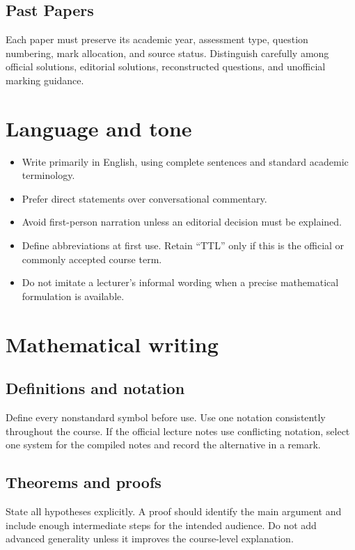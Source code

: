 \subsection{Past Papers}
Each paper must preserve its academic year, assessment type, question numbering, mark
allocation, and source status. Distinguish carefully among official solutions,
editorial solutions, reconstructed questions, and unofficial marking guidance.

\section{Language and tone}

\begin{itemize}
  \item Write primarily in English, using complete sentences and standard academic
        terminology.
  \item Prefer direct statements over conversational commentary.
  \item Avoid first-person narration unless an editorial decision must be explained.
  \item Define abbreviations at first use. Retain ``TTL'' only if this is the official
        or commonly accepted course term.
  \item Do not imitate a lecturer's informal wording when a precise mathematical
        formulation is available.
\end{itemize}

\section{Mathematical writing}

\subsection{Definitions and notation}
Define every nonstandard symbol before use. Use one notation consistently throughout
the course. If the official lecture notes use conflicting notation, select one system
for the compiled notes and record the alternative in a remark.

\subsection{Theorems and proofs}
State all hypotheses explicitly. A proof should identify the main argument and include
enough intermediate steps for the intended audience. Do not add advanced generality
unless it improves the course-level explanation.

